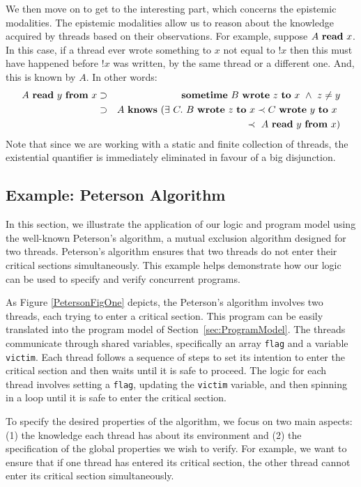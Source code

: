 We then move on to get to the interesting part, which concerns the epistemic modalities. The epistemic modalities allow us to reason about the knowledge acquired by threads based on their observations. For example, suppose $A\ \mathbf{read}\ x$. In this case, if a thread ever wrote something to $x$ not equal to $!x$ then this must have happened before $!x$ was written,  by the same thread or a different one. And, this is known by $A$. In other words:
%
  \begin{eqnarray*}
  A\ \Reads\ y\ \From\ x & \Implies & \Sometime\ B\ \Writes\ z\ \To\ x\ \wedge\ z\neq y \\
   & \Implies & A\ \Knows\ (\exists\ C.\ B\ \Writes\ z\ \To\ x \HappensBefore C\ \Writes\ y\ \To\ x\ \\
   & &  \HappensBefore\ A\ \Reads\ y\ \From\ x)
  \end{eqnarray*}
Note that since we are working with a static and finite collection of threads, the existential quantifier is immediately eliminated in favour of a big disjunction.

\subsection{Example: Peterson Algorithm}

In this section, we illustrate the application of our logic and program model using the well-known Peterson's algorithm, a mutual exclusion algorithm designed for two threads. Peterson's algorithm ensures that two threads do not enter their critical sections simultaneously. This example helps demonstrate how our logic can be used to specify and verify concurrent programs.

As Figure \ref{PetersonFigOne} depicts, the Peterson's algorithm involves two threads, each trying to enter a critical section. This program can be easily translated into the program model of Section~\ref{sec:ProgramModel}. The threads communicate through shared variables, specifically an array \texttt{flag} and a variable \texttt{victim}. Each thread follows a sequence of steps to set its intention to enter the critical section and then waits until it is safe to proceed. The logic for each thread involves setting a \texttt{flag}, updating the \texttt{victim} variable, and then spinning in a loop until it is safe to enter the critical section.

To specify the desired properties of the algorithm, we focus on two main aspects: (1) the knowledge each thread has about its environment and (2) the specification of the global properties we wish to verify. For example, we want to ensure that if one thread has entered its critical section, the other thread cannot enter its critical section simultaneously.

